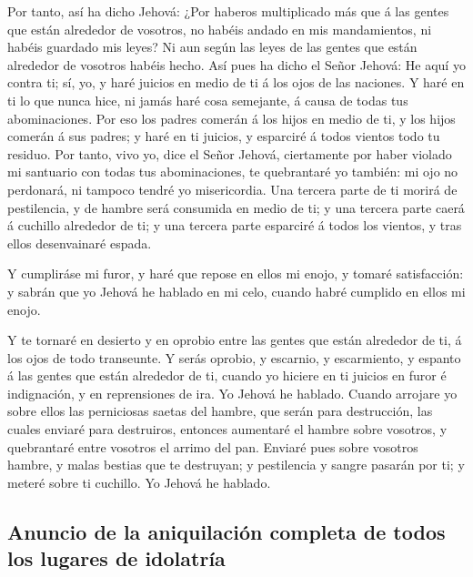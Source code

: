  Por tanto, así ha dicho Jehová: ¿Por haberos multiplicado
más que á las gentes que están alrededor de vosotros, no habéis andado
en mis mandamientos, ni habéis guardado mis leyes? Ni aun según las
leyes de las gentes que están alrededor de vosotros habéis hecho.
 Así pues ha dicho el Señor Jehová: He aquí yo contra ti;
sí, yo, y haré juicios en medio de ti á los ojos de las naciones.
 Y haré en ti lo que nunca hice, ni jamás haré cosa
semejante, á causa de todas tus abominaciones.  Por eso
los padres comerán á los hijos en medio de ti, y los hijos comerán á sus
padres; y haré en ti juicios, y esparciré á todos vientos todo tu
residuo.  Por tanto, vivo yo, dice el Señor Jehová,
ciertamente por haber violado mi santuario con todas tus abominaciones,
te quebrantaré yo también: mi ojo no perdonará, ni tampoco tendré yo
misericordia.  Una tercera parte de ti morirá de
pestilencia, y de hambre será consumida en medio de ti; y una tercera
parte caerá á cuchillo alrededor de ti; y una tercera parte esparciré á
todos los vientos, y tras ellos desenvainaré espada.

 Y cumpliráse mi furor, y haré que repose en ellos mi
enojo, y tomaré satisfacción: y sabrán que yo Jehová he hablado en mi
celo, cuando habré cumplido en ellos mi enojo.

 Y te tornaré en desierto y en oprobio entre las gentes
que están alrededor de ti, á los ojos de todo transeunte.
 Y serás oprobio, y escarnio, y escarmiento, y espanto á
las gentes que están alrededor de ti, cuando yo hiciere en ti juicios en
furor é indignación, y en reprensiones de ira. Yo Jehová he hablado.
 Cuando arrojare yo sobre ellos las perniciosas saetas
del hambre, que serán para destrucción, las cuales enviaré para
destruiros, entonces aumentaré el hambre sobre vosotros, y quebrantaré
entre vosotros el arrimo del pan.  Enviaré pues sobre
vosotros hambre, y malas bestias que te destruyan; y pestilencia y
sangre pasarán por ti; y meteré sobre ti cuchillo. Yo Jehová he hablado.

\hypertarget{anuncio-de-la-aniquilaciuxf3n-completa-de-todos-los-lugares-de-idolatruxeda}{%
\subsection{Anuncio de la aniquilación completa de todos los lugares de
idolatría}\label{anuncio-de-la-aniquilaciuxf3n-completa-de-todos-los-lugares-de-idolatruxeda}}

